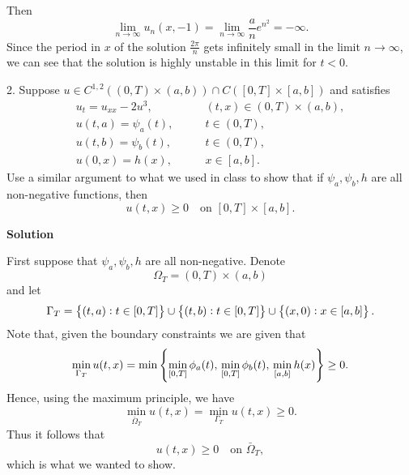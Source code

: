 \documentclass{article}
\begin{document}
Then
%
\begin{equation*}
    \lim_{n \to \infty} u_n(x, -1)
        = \lim_{n \to \infty} \frac{a}{n} e^{n^2}
        = - \infty
    .
\end{equation*}
%
Since the period in $x$ of the solution $\frac{2 \pi}{n}$ gets
infinitely small in the limit $n \to \infty$, we can see that the
solution is highly unstable in this limit for $t < 0$.

\newpage

2. Suppose
$u \in C^{1, 2}((0, T) \times (a, b)) \cap C([0, T] \times [a, b])$ and satisfies
%
\begin{align*}
    u_t = u_{xx} - 2u^3, &\qquad (t, x) \in (0, T) \times (a, b), \\
    u(t, a) = \psi_a(t), &\qquad t \in (0, T), \\
    u(t, b) = \psi_b(t), &\qquad t \in (0, T), \\
    u(0, x) = h(x), &\qquad x \in [a, b].
\end{align*}
%
Use a similar argument to what we used in class to show that if
$\psi_a, \psi_b, h$ are all non-negative functions, then
%
\begin{equation*}
    u(t, x) \geq 0 \quad \text{on } [0, T] \times [a, b]
    .
\end{equation*}

\textbf{Solution}

First suppose that $\psi_a, \psi_b, h$ are all non-negative. Denote
\[\Omega_T = (0, T) \times (a, b)\] and let
%
\begin{equation*}
    \Gamma_T = \cbr{(t, a): t \in [0, T]}
                \cup \cbr{(t, b): t \in [0, T]}
                \cup \cbr{(x, 0): x \in [a, b]}
    .
\end{equation*}
%
Note that, given the boundary constraints we are given that
%
\begin{equation*}
    \min_{\Gamma_T} u(t, x)
        = \min \cbr{
            \min_{[0, T]} \phi_a(t), \,
            \min_{[0, T]} \phi_b(t), \,
            \min_{[a, b]} h(x)
          }
        \geq 0
        .
\end{equation*}
%
Hence, using the maximum principle, we have
%
\begin{equation*}
    \min_{\bar{\Omega}_T} u(t, x) = \min_{\Gamma_T} u(t, x) \geq 0
    .
\end{equation*}
%
Thus it follows that
%
\begin{equation*}
    u(t, x) \geq 0 \quad \text{on } \bar{\Omega}_T
    ,
\end{equation*}
%
which is what we wanted to show.
\end{document}
